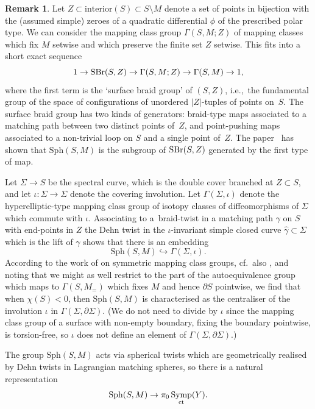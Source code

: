 \documentclass[10pt,a4paper]{amsart}
\DeclareMathOperator{\Symp}{Symp}
\theoremstyle{definition}
\newtheorem{rmk}[thm]{Remark}
\numberwithin{equation}{section}
\begin{document}
\begin{rmk}
Let $Z \subset \mathrm{interior}(S) \subset S\setminus M$ denote a set of points in bijection with the (assumed simple) zeroes of a quadratic differential $\phi$ of the prescribed polar type. We can consider the mapping class group $\Gamma(S,M;Z)$ of mapping classes which fix $M$ setwise and which preserve the finite set $Z$ setwise. This fits into a short exact sequence
\[
1 \to {\rm SBr}(S,Z) \to \Gamma(S,M;Z) \to \Gamma(S,M) \to 1,
\]
where the first term is the `surface braid group' of $(S,Z)$, i.e.,~the fundamental group of the space of configurations of unordered $|Z|$-tuples of points on~$S$. The surface braid group has two kinds of generators: braid-type maps associated to a matching path between two distinct points of~$Z$, and point-pushing maps associated to a non-trivial loop on $S$ and a single point of~$Z$. The paper~\cite{QiuYu:spherical-twist-group} has shown that $\mathrm{Sph}(S,M)$ is the subgroup of ${\rm SBr}(S,Z)$ generated by the first type of map.

Let $\Sigma \to S$ be the spectral curve, which is the double cover branched at $Z \subset S$, and let $\iota\colon \Sigma \to \Sigma$ denote the covering involution. Let $\Gamma(\Sigma,\iota)$ denote the hyperelliptic-type mapping class group of isotopy classes of diffeomorphisms of $\Sigma$ which commute with $\iota$. Associating to a~braid-twist in a matching path $\gamma$ on $S$ with end-points in $Z$ the Dehn twist in the $\iota$-invariant simple closed curve $\hat\gamma \subset \Sigma$ which is the lift of $\gamma$ shows that there is an embedding
\[
\mathrm{Sph}(S,M) \hookrightarrow \Gamma(\Sigma,\iota).
\]
According to the work of \cite{Birman-Hilden} on symmetric mapping class groups, cf.~also \cite{Margalit-Winarski}, and noting that we might as well restrict to the part of the autoequivalence group which maps to $\Gamma(S,M_{=})$ which fixes $M$ and hence $\partial S$ pointwise, we find that when $\chi(S)<0$, then $\mathrm{Sph}(S,M)$ is characterised as the centraliser of the involution $\iota$ in $\Gamma(\Sigma,\partial\Sigma)$. (We do not need to divide by $\iota$ since the mapping class group of a surface with non-empty boundary, fixing the boundary pointwise, is torsion-free, so $\iota$ does not define an element of $\Gamma(\Sigma,\partial\Sigma)$.)
\end{rmk}


The group $\mathrm{Sph}(S,M)$ acts via spherical twists which are geometrically realised by Dehn twists in Lagrangian matching spheres, so there is a natural representation
\[
\mathrm{Sph}(S,M) \to \pi_0\Symp_{\rm ct}(Y). \]
\end{document}
